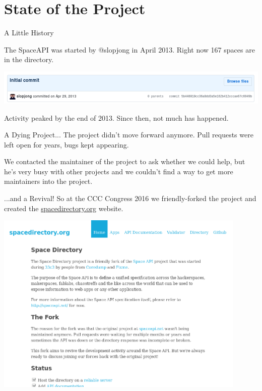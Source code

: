 \section{State of the Project}

\begin{frame}{A Little History}

	The SpaceAPI was started by @slopjong in April 2013. Right now 167 spaces are
	in the directory.

	\vspace{1em}
	\centerline{
		\includegraphics[width=\textwidth]{what_is_the_spaceapi/commit.png}
	}

	\pause

	Activity peaked by the end of 2013. Since then, not much has happened.

\end{frame}

\begin{frame}{A Dying Project...}
	The project didn't move forward anymore. Pull requests were left open for
	years, bugs kept appearing.

	We contacted the maintainer of the project to ask whether we could help, but
	he's very busy with other projects and we couldn't find a way to get more
	maintainers into the project.
\end{frame}

\begin{frame}{...and a Revival!}
	So at the CCC Congress 2016 we friendly-forked the project and created the
	\url{spacedirectory.org} website.

	\vspace{2em}
	\centerline{
		\includegraphics[width=0.9\textwidth]{what_is_the_spaceapi/spacedirectory.png}
	}
\end{frame}

